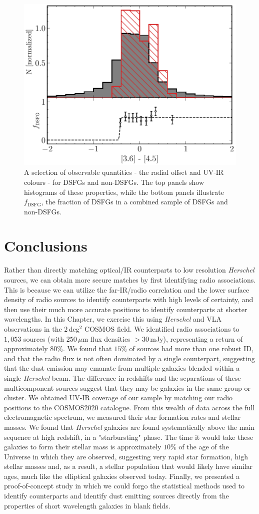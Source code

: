 \begin{figure}
	\includegraphics[width=0.49\columnwidth, height=0.25\textheight]{Figures/3645_smg.pdf}
	\caption[Historgams of DSFGs compared to non-DSFGs in COSMOS]{A selection of observable quantities - the radial offset and UV-IR colours - for DSFGs and non-DSFGs. The top panels show histograms of these properties, while the bottom panels illustrate $f_\textrm{DSFG}$, the fraction of DSFGs in a combined sample of DSFGs and non-DSFGs.}
	\label{fig:smg_nonsmg}
\end{figure}

\section{Conclusions}

Rather than directly matching optical/IR counterparts to low resolution \textit{Herschel} sources, we can obtain more secure matches by first identifying radio associations. This is because we can utilize the far-IR/radio correlation and the lower surface density of radio sources to identify counterparts with high levels of certainty, and then use their much more accurate positions to identify counterparts at shorter wavelengths. In this Chapter, we exercise this using \textit{Herschel} and VLA observations in the $2\,$deg$^2$ COSMOS field. We identified radio associations to $1,053$ sources (with $250\,\mu$m flux densities $> 30\,$mJy), representing a return of approximately $80\%$. We found that $15\%$ of sources had more than one robust ID, and that the radio flux is not often dominated by a single counterpart, suggesting that the dust emission may emanate from multiple galaxies blended within a single \textit{Herschel} beam. The difference in redshifts and the separations of these multicomponent sources suggest that they may be galaxies in the same group or cluster. We obtained UV-IR coverage of our sample by matching our radio positions to the COSMOS2020 catalogue. From this wealth of data across the full electromagnetic spectrum, we measured their star formation rates and stellar masses. We found that \textit{Herschel} galaxies are found systematically above the main sequence at high redshift, in a "starbursting" phase. The time it would take these galaxies to form their stellar mass is approximately $10\%$ of the age of the Universe in which they are observed, suggesting very rapid star formation, high stellar masses and, as a result, a stellar population that would likely have similar ages, much like the elliptical galaxies observed today. Finally, we presented a proof-of-concept study in which we could forgo the statistical methods used to identify counterparts and identify dust emitting sources directly from the properties of short wavelength galaxies in blank fields.
